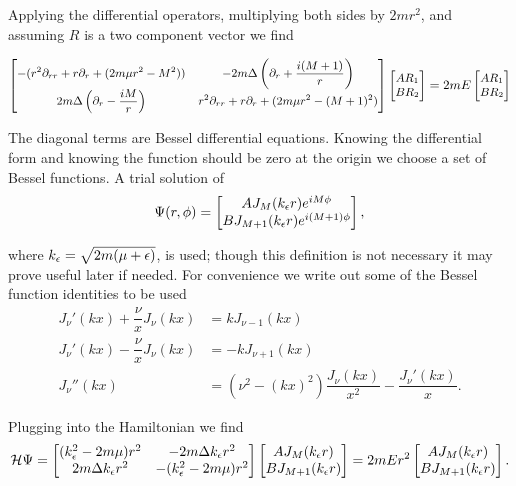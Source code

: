 Applying the differential operators, multiplying both sides by $2mr^2$, and assuming $R$ is a two component vector we find

\begin{equation*}
  \small
  \begin{bmatrix}
    -(r^2\partial_{rr} +r\partial_r +(2m\mu r^2 -M^2)) & -2m\Delta \left(\partial_r + \dfrac{i(M+1)}{r}\right) \\
    2m\Delta \left(\partial_r - \dfrac{iM}{r}\right) & r^2\partial_{rr} +r\partial_r +(2m\mu r^2 -(M+1)^2)
  \end{bmatrix} 
  \begin{bmatrix}
    AR_1 \\
    BR_2 \\
  \end{bmatrix} 
  = 2mE 
  \begin{bmatrix}
    AR_1 \\
    BR_2 \\
  \end{bmatrix} 
\end{equation*}

The diagonal terms are Bessel differential equations.
Knowing the differential form and knowing the function should be zero at the origin we choose a set of Bessel functions.
A trial solution of
\begin{equation}
  \Psi(r,\phi) = 
  \begin{bmatrix}
    A J_M(k_{\epsilon} r) e^{iM\phi} \\
    B J_{M+1}(k_{\epsilon} r) e^{i(M+1)\phi}
  \end{bmatrix},
\end{equation}

where $k_{\epsilon} = \sqrt{2m(\mu + \epsilon)}$, is used; though this definition is not necessary it may prove useful later if needed.
For convenience we write out some of the Bessel function identities to be used
\begin{align*}
  J_{\nu}'(kx) + \dfrac{\nu}{x}J_{\nu}(kx) &= kJ_{\nu-1}(kx) \\
  J_{\nu}'(kx) - \dfrac{\nu}{x}J_{\nu}(kx) &= - kJ_{\nu+1}(kx) \\
  J_{\nu}''(kx) &= (\nu^2 - (kx)^2)\dfrac{J_{\nu}(kx)}{x^2} - \dfrac{J_{\nu}'(kx)}{x}.
\end{align*}

Plugging into the Hamiltonian we find
\begin{equation*}
  \mathcal{H} \Psi = 
  \begin{bmatrix}
  (k_{\epsilon}^2-2m\mu) r^2 & -2m\Delta k_{\epsilon} r^2 \\
  2m\Delta k_{\epsilon} r^2 & -(k_{\epsilon}^2-2m\mu) r^2
  \end{bmatrix} 
  \begin{bmatrix}
    A J_M(k_{\epsilon} r) \\
    B J_{M+1}(k_{\epsilon} r) 
  \end{bmatrix}
  = 2mEr^2
  \begin{bmatrix}
    A J_M(k_{\epsilon} r) \\
    B J_{M+1}(k_{\epsilon} r) 
  \end{bmatrix}.
\end{equation*}

